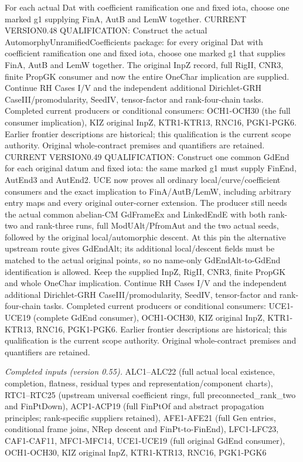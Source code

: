 \documentclass[11pt,a4paper]{article}
\numberwithin{equation}{section}
\theoremstyle{remark}\newtheorem{remark}[theorem]{Remark}
\begin{document}
For each actual Dat with coefficient ramification one and fixed iota, choose one marked g1 supplying FinA, AutB and LemW together. CURRENT VERSION0.48 QUALIFICATION: Construct the actual AutomorphyUnramifiedCoefficients package: for every original Dat with coefficient ramification one and fixed iota, choose one marked g1 that supplies FinA, AutB and LemW together. The original InpZ record, full RigII, CNR3, finite PropGK consumer and now the entire OneChar implication are supplied. Continue RH Cases I/V and the independent additional Dirichlet-GRH CaseIII/promodularity, SeedIV, tensor-factor and rank-four-chain tasks. Completed current producers or conditional consumers: OCH1-OCH30 (the full consumer implication), KIZ original InpZ, KTR1-KTR13, RNC16, PGK1-PGK6. Earlier frontier descriptions are historical; this qualification is the current scope authority. Original whole-contract premises and quantifiers are retained. CURRENT VERSION0.49 QUALIFICATION: Construct one common GdEnd for each original datum and fixed iota: the same marked g1 must supply FinEnd, AutEnd3 and AutEnd2. UCE now proves all ordinary local/curve/coefficient consumers and the exact implication to FinA/AutB/LemW, including arbitrary entry maps and every original outer-corner extension. The producer still needs the actual common abelian-CM GdFrameEx and LinkedEndE with both rank-two and rank-three runs, full ModUAlt/PfromAut and the two actual seeds, followed by the original local/automorphic descent. At this pin the alternative upstream route gives GdEndAlt; its additional local/descent fields must be matched to the actual original points, so no name-only GdEndAlt-to-GdEnd identification is allowed. Keep the supplied InpZ, RigII, CNR3, finite PropGK and whole OneChar implication. Continue RH Cases I/V and the independent additional Dirichlet-GRH CaseIII/promodularity, SeedIV, tensor-factor and rank-four-chain tasks. Completed current producers or conditional consumers: UCE1-UCE19 (complete GdEnd consumer), OCH1-OCH30, KIZ original InpZ, KTR1-KTR13, RNC16, PGK1-PGK6. Earlier frontier descriptions are historical; this qualification is the current scope authority. Original whole-contract premises and quantifiers are retained.

\emph{Completed inputs (version 0.55).} ALC1–ALC22 (full actual local existence, completion, flatness, residual types and representation/component charts), RTC1–RTC25 (upstream universal coefficient rings, full preconnected\_\allowbreak rank\_\allowbreak two and FinPtDown), ACP1-ACP19 (full FinPtOf and abstract propagation principles; rank-specific suppliers retained), AFE1-AFE21 (full Gen entries, conditional frame joins, NRep descent and FinPt-to-FinEnd), LFC1-LFC23, CAF1-CAF11, MFC1-MFC14, UCE1-UCE19 (full original GdEnd consumer), OCH1-OCH30, KIZ original InpZ, KTR1-KTR13, RNC16, PGK1-PGK6
\end{document}

